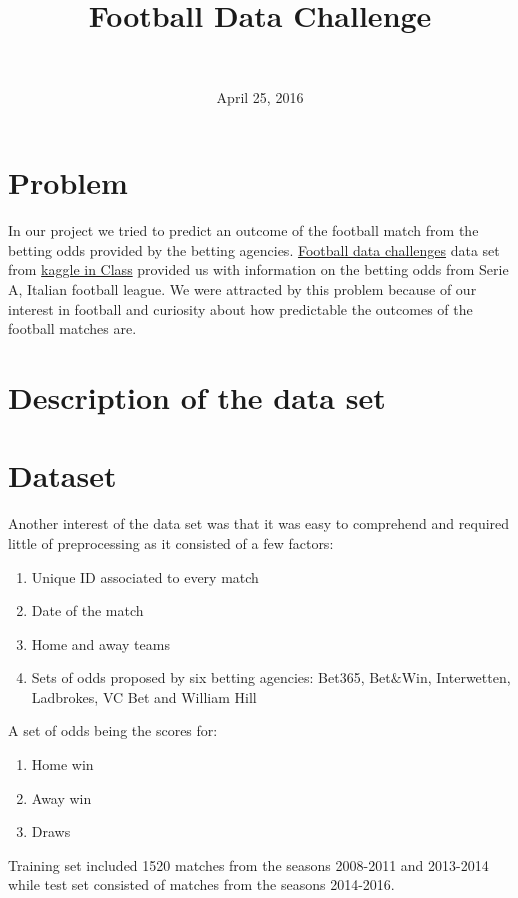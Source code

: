 \documentclass[11pt]{article}
\title{Football Data Challenge}
\author{\text{\small{prepared by} \large{Dimitri Lajou, Pijus Simonaitis}} \\ \text{\large{ENS Lyon, DBDM M1}}}
\date{April 25, 2016}
\begin{document}
\maketitle

\section{Problem}

In our project we tried to predict an outcome of the football match from the betting odds provided by the betting agencies. \href{https://inclass.kaggle.com/c/football-data-challenge/}{Football data challenges} data set from \href{https://inclass.kaggle.com/}{kaggle in Class} provided us with information on the betting odds from Serie A, Italian football league. We were attracted by this problem because of our interest in football and curiosity about how predictable the outcomes of the football matches are.
\section{Description of the data set}

\section{Dataset}

Another interest of the data set was that it was easy to comprehend and required little of preprocessing as it consisted of a few factors:
\begin{enumerate}
		\item Unique ID associated to every match
		\item Date of the match
		\item Home and away teams
		\item Sets of odds proposed by six betting agencies: Bet365, Bet$\&$Win, Interwetten, Ladbrokes, VC Bet and William Hill 
\end{enumerate}

A set of odds being the scores for:

\begin{enumerate}
		\item Home win
		\item Away win
		\item Draws 
\end{enumerate}

Training set included 1520 matches from the seasons 2008-2011 and 2013-2014 while test set consisted of matches from the seasons 2014-2016. 
\end{document}
